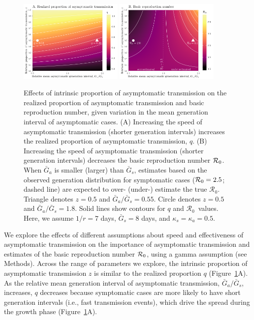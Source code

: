 \documentclass[12pt]{article}
\newcommand{\Ro}{\ensuremath{{\mathcal R}_{0}}\xspace}
\begin{document}
\begin{figure}[b!]
\begin{center}
\includegraphics[width=0.45\textwidth]{../figheatmap.pdf}
\mbox{\hspace{0.05\textwidth}}
\includegraphics[width=0.45\textwidth]{../figheatmap_R0.pdf}
\caption{Effects of intrinsic proportion of asymptomatic transmission on the realized proportion of asymptomatic transmission and basic reproduction number, given variation in
the mean generation interval of asymptomatic cases. 
(A) Increasing the speed of asymptomatic transmission (shorter generation intervals) increases the realized proportion of asymptomatic transmission, $q$.
(B) Increasing the speed of asymptomatic transmission (shorter generation intervals) decreases the basic reproduction number ${\cal{R}}_0$.
When $\bar G_a$ is smaller (larger) than $\bar G_s$, estimates based on the observed generation distribution for symptomatic cases (${\cal{R}}_0=2.5$; dashed line) are expected to over- (under-) estimate the true $\mathcal R_0$.
Triangle denotes $z=0.5$ and $\bar G_a/\bar G_s = 0.55$.
Circle denotes $z=0.5$ and $\bar G_a/\bar G_s = 1.8$.
Solid lines show contours for $q$ and \Ro\ values. 
Here, we assume $1/r=7$ days, $\bar G_s=8$ days, and $\kappa_s=\kappa_a=0.5$.
\label{fig.importance}}
\end{center}
\end{figure}

We explore the effects of different assumptions about speed and effectiveness of asymptomatic transmission on the importance of asymptomatic transmission and estimates of the basic reproduction number ${\cal{R}}_0$, using a gamma assumption (see Methods).
Across the range of parameters we explore, the intrinsic proportion of asymptomatic transmission $z$ is similar to the realized proportion $q$ (Figure~\ref{fig.importance}A).
As the relative mean generation interval of asymptomatic transmission, $\bar G_a/\bar G_s$, increases, $q$ decreases because symptomatic cases are more likely to have short generation intervals (i.e., fast transmission events), which drive the spread during the growth phase (Figure~\ref{fig.importance}A).
\end{document}
